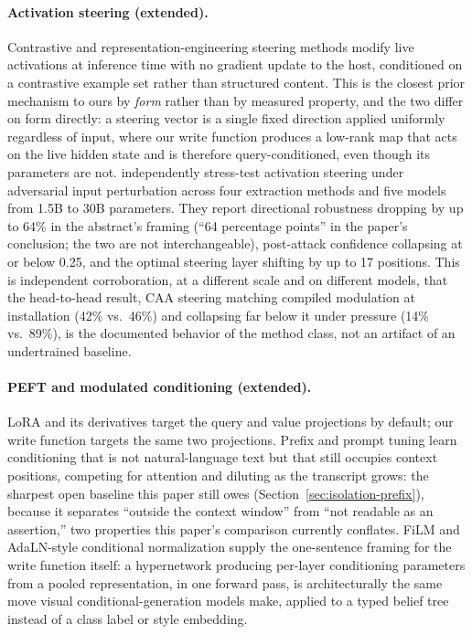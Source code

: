 \paragraph{Activation steering (extended).} Contrastive and representation-engineering
steering methods \citep{turner2023activation,zou2023representation,rimsky2024caa}
modify live activations at inference time with no gradient update to the host,
conditioned on a contrastive example set rather than structured content. This is the
closest prior mechanism to ours by \emph{form} rather than by measured property, and
the two differ on form directly: a steering vector is a single fixed direction applied
uniformly regardless of input, where our write function produces a low-rank map that
acts on the live hidden state and is therefore query-conditioned, even though its
parameters are not. \citet{le2026steeringrobustness} independently stress-test
activation steering under adversarial input perturbation across four extraction methods
and five models from 1.5B to 30B parameters. They report directional robustness
dropping by up to 64\% in the abstract's framing (``64 percentage points'' in the
paper's conclusion; the two are not interchangeable), post-attack confidence collapsing
at or below 0.25, and the optimal steering layer shifting by up to 17 positions. This is
independent corroboration, at a different scale and on different models, that the
head-to-head result, CAA steering matching compiled modulation at installation (42\%
vs.\ 46\%) and collapsing far below it under pressure (14\% vs.\ 89\%), is the
documented behavior of the method class, not an artifact of an undertrained baseline.

\paragraph{PEFT and modulated conditioning (extended).} LoRA \citep{hu2021lora} and its
derivatives target the query and value projections by default; our write function
targets the same two projections. Prefix and prompt tuning \citep{li2021prefix,lester2021power}
learn conditioning that is not natural-language text but that still occupies context
positions, competing for attention and diluting as the transcript grows: the sharpest
open baseline this paper still owes (Section~\ref{sec:isolation-prefix}), because it
separates ``outside the context window'' from ``not readable as an assertion,'' two
properties this paper's comparison currently conflates. FiLM \citep{perez1970film} and
AdaLN-style conditional normalization \citep{xu2019adain} supply the one-sentence
framing for the write function itself: a hypernetwork producing per-layer conditioning
parameters from a pooled representation, in one forward pass, is architecturally the
same move visual conditional-generation models make, applied to a typed belief tree
instead of a class label or style embedding.


